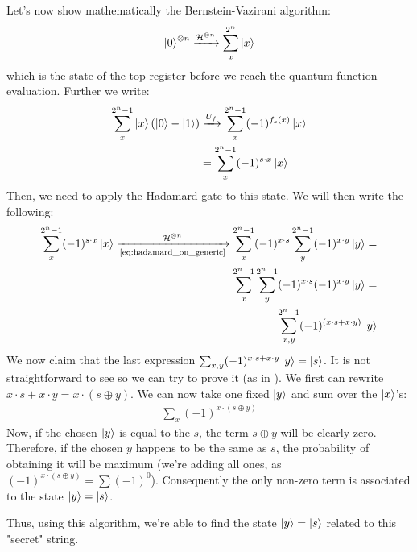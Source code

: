 Let's now show mathematically the Bernstein-Vazirani algorithm:
\begin{align}
  \ket{0}^{\otimes n} \xrightarrow{\mathcal{H}^{\otimes n}} \sum_x^{2^n} \ket{x}
\end{align}
which is the state of the top-register before we reach the quantum function evaluation. Further we write:
\begin{align}
  \sum_x^{2^n-1} \ket{x}(\ket{0}-\ket{1}) &\xrightarrow{U_f} \sum_x^{2^n-1} (-1)^{f_s(x)}\ket{x} \\ 
                                        &=\sum_x^{2^n-1} (-1)^{s\cdot x} \ket{x} 
\end{align}
Then, we need to apply the Hadamard gate to this state. We will then write the following:
\begin{align}
  \sum_x^{2^n-1} (-1)^{s\cdot x} \ket{x} \xrightarrow[\text{\autoref{eq:hadamard_on_generic}}]{\mathcal{H}^{\otimes n}} \sum_x^{2^n-1} (-1)^{x\cdot s} 
  \sum_y^{2^n-1} (-1)^{x \cdot y} \ket{y} =\\
\sum_x^{2^n-1} \sum_y^{2^n-1} (-1)^{x\cdot s} (-1)^{x \cdot y} \ket{y} =\\
\sum_{x,y}^{2^n-1} (-1)^{(x\cdot s + x\cdot y)} \ket{y}
\end{align}
We now claim that the last expression $\sum_{x,y} (-1)^{x\cdot s + x\cdot y}\ket{y} = \ket{s}$. It is not straightforward to see so we can try to prove it (as
in \cite{noauthor_bernsteinvazirani_2022}).
We first can rewrite $x\cdot s + x\cdot y=x\cdot (s\oplus y)$. 
We can now take one fixed $\ket{y}$ and sum over the $\ket{x}$'s:
\begin{align}
  \sum_{x} (-1)^{x \cdot (s \oplus y)}
\end{align}
Now, if the chosen $\ket{y}$ is equal to the $s$, the term $s\oplus y$ will be clearly zero. Therefore, if the chosen $y$ 
happens to be the same as $s$, the probability of obtaining it will be maximum (we're adding all ones, as $(-1)^{x\cdot(s\oplus y)} = \sum (-1)^{0}$).
Consequently the only non-zero term is associated to the state $\ket{y}=\ket{s}$.

Thus, using this algorithm, we're able to find the state $\ket{y}=\ket{s}$ related to this "secret" string.
